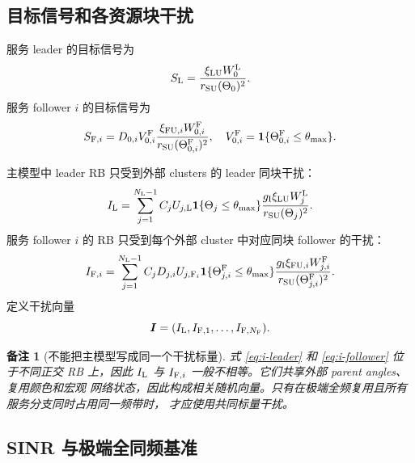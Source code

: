 \documentclass[UTF8,a4paper,11pt]{ctexart}
\newtheorem{remark}{备注}[section]
\newcommand{\ind}{\mathbf 1}
\newcommand{\NL}{N_{\mathrm L}}
\newcommand{\NF}{N_{\mathrm F}}
\newcommand{\thetam}{\theta_{\max}}
\newcommand{\Ivec}{\bm I}
\begin{document}
\subsection{目标信号和各资源块干扰}

服务 leader 的目标信号为
\begin{equation}
 S_{\rm L}
 =\frac{\xi_{\rm LU}W_0^{\rm L}}
 {r_{\rm SU}(\Theta_0)^2}.
 \label{eq:desired-leader}
\end{equation}
服务 follower $i$ 的目标信号为
\begin{equation}
 S_{{\rm F},i}
 =
 D_{0,i}V_{0,i}^{\rm F}
 \frac{\xi_{{\rm FU},i}W_{0,i}^{\rm F}}
 {r_{\rm SU}(\Theta_{0,i}^{\rm F})^2},
 \quad
 V_{0,i}^{\rm F}=\ind\{\Theta_{0,i}^{\rm F}\leq\thetam\}.
 \label{eq:desired-follower}
\end{equation}

主模型中 leader RB 只受到外部 clusters 的 leader 同块干扰：
\begin{equation}
 I_{\rm L}
 =
 \sum_{j=1}^{\NL-1}
 C_jU_{j,\rm L}
 \ind\{\Theta_j\leq\thetam\}
 \frac{g_{\rm I}\xi_{\rm LU}W_{j}^{\rm L}}
 {r_{\rm SU}(\Theta_j)^2}.
 \label{eq:i-leader}
\end{equation}
服务 follower $i$ 的 RB 只受到每个外部 cluster 中对应同块 follower 的干扰：
\begin{equation}
 I_{{\rm F},i}
 =
 \sum_{j=1}^{\NL-1}
 C_jD_{j,i}U_{j,{\rm F}_i}
 \ind\{\Theta_{j,i}^{\rm F}\leq\thetam\}
 \frac{g_{\rm I}\xi_{{\rm FU},i}W_{j,i}^{\rm F}}
 {r_{\rm SU}(\Theta_{j,i}^{\rm F})^2}.
 \label{eq:i-follower}
\end{equation}
定义干扰向量
\begin{equation}
 \Ivec=(I_{\rm L},I_{{\rm F},1},\ldots,I_{{\rm F},\NF}).
 \label{eq:interference-vector}
\end{equation}

\begin{remark}[不能把主模型写成同一个干扰标量]
式 \eqref{eq:i-leader} 和 \eqref{eq:i-follower} 位于不同正交 RB 上，因此
$I_{\rm L}$ 与 $I_{{\rm F},i}$ 一般不相等。它们共享外部 parent angles、复用颜色和宏观
网络状态，因此构成相关随机向量。只有在极端全频复用且所有服务分支同时占用同一频带时，
才应使用共同标量干扰。
\end{remark}

\subsection{SINR 与极端全同频基准}
\end{document}
